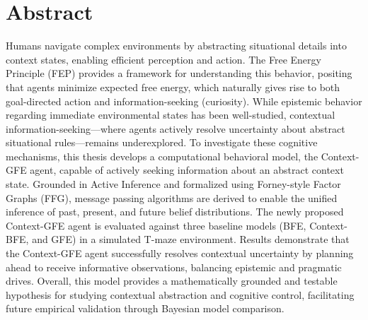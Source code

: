 \chapter*{Abstract}

Humans navigate complex environments by abstracting situational details into context states, enabling efficient perception and action. The Free Energy Principle (FEP) provides a framework for understanding this behavior, positing that agents minimize expected free energy, which naturally gives rise to both goal-directed action and information-seeking (curiosity). While epistemic behavior regarding immediate environmental states has been well-studied, contextual information-seeking—where agents actively resolve uncertainty about abstract situational rules—remains underexplored. To investigate these cognitive mechanisms, this thesis develops a computational behavioral model, the Context-GFE agent, capable of actively seeking information about an abstract context state. Grounded in Active Inference and formalized using Forney-style Factor Graphs (FFG), message passing algorithms are derived to enable the unified inference of past, present, and future belief distributions. The newly proposed Context-GFE agent is evaluated against three baseline models (BFE, Context-BFE, and GFE) in a simulated T-maze environment. Results demonstrate that the Context-GFE agent successfully resolves contextual uncertainty by planning ahead to receive informative observations, balancing epistemic and pragmatic drives. Overall, this model provides a mathematically grounded and testable hypothesis for studying contextual abstraction and cognitive control, facilitating future empirical validation through Bayesian model comparison.